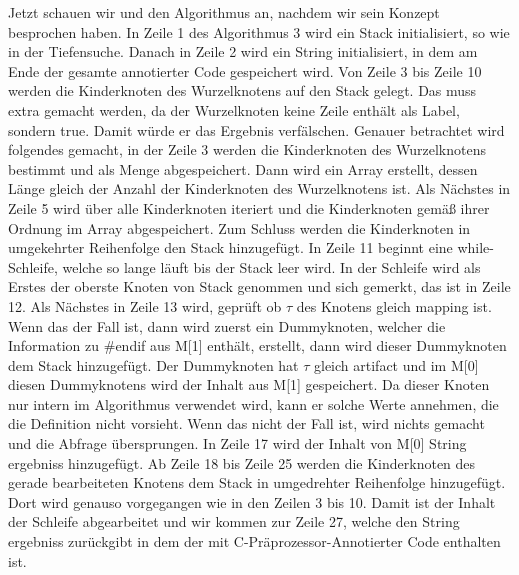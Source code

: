 Jetzt schauen wir und den Algorithmus an, nachdem wir sein Konzept besprochen haben. In Zeile 1 des Algorithmus 3 wird ein Stack initialisiert, so wie in der Tiefensuche. Danach in Zeile 2 wird ein String initialisiert, in dem am Ende der gesamte annotierter Code gespeichert wird. Von Zeile 3 bis Zeile 10 werden die Kinderknoten des Wurzelknotens auf den Stack gelegt. Das muss extra gemacht werden, da der Wurzelknoten keine Zeile enthält als Label, sondern true. Damit würde er das Ergebnis verfälschen. Genauer betrachtet wird folgendes gemacht, in der Zeile 3 werden die Kinderknoten des Wurzelknotens bestimmt und als Menge abgespeichert. Dann wird ein Array erstellt, dessen Länge gleich der Anzahl der Kinderknoten des Wurzelknotens ist. Als Nächstes in Zeile 5 wird über alle Kinderknoten iteriert und die Kinderknoten gemäß ihrer Ordnung im Array abgespeichert. Zum Schluss werden die Kinderknoten in umgekehrter Reihenfolge den Stack hinzugefügt. In Zeile 11 beginnt eine while-Schleife, welche so lange läuft bis der Stack leer wird. In der Schleife wird als Erstes der oberste Knoten von Stack genommen und sich gemerkt, das ist in Zeile 12. Als Nächstes in Zeile 13 wird, geprüft ob $\tau$ des Knotens gleich mapping ist. Wenn das der Fall ist, dann wird zuerst ein Dummyknoten, welcher die Information zu \#endif aus M[1] enthält, erstellt, dann wird dieser Dummyknoten dem Stack hinzugefügt. Der Dummyknoten hat $\tau$ gleich artifact und im M[0] diesen Dummyknotens wird der Inhalt aus M[1] gespeichert. Da dieser Knoten nur intern im Algorithmus verwendet wird, kann er solche Werte annehmen, die die Definition nicht vorsieht. Wenn das nicht der Fall ist, wird nichts gemacht und die Abfrage übersprungen. In Zeile 17 wird der Inhalt von M[0] String \glqq ergebniss\grqq{} hinzugefügt. Ab Zeile 18 bis Zeile 25 werden die Kinderknoten des gerade bearbeiteten Knotens dem Stack in umgedrehter Reihenfolge hinzugefügt. Dort wird genauso vorgegangen wie in den Zeilen 3 bis 10. Damit ist der Inhalt der Schleife abgearbeitet und wir kommen zur Zeile 27, welche den String \glqq ergebniss\grqq{} zurückgibt in dem der mit C-Präprozessor-Annotierter Code enthalten ist.
